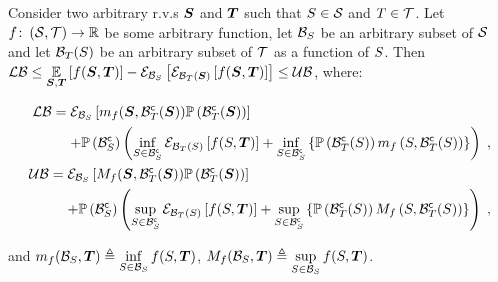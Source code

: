 \begin{propositionE}
	\label{thm:bound_multi_cond}
	Consider two arbitrary r.v.s $\RV$ and $\RVI$ such that $\variable\in\Space$ and $\variableI\in\SpaceI$. Let $f\colon\left(\Space,\SpaceI\right)\to\R$ be some arbitrary function, let $\subSpaceI{\variable}$ be an arbitrary subset of $\Space$ and let $\subSpaceI{\variableI}(\variable)$ be an arbitrary subset of $\SpaceI$ as a function of $\variable$. Then $\lowerbound\leq\expectation{f(\RV,\RVI)}{\RV,\RVI}-\partialexpectation{\partialexpectation{f(\RV,\RVI)}{\subSpaceI{\variableI}(\RV)}}{\subSpaceI{\variable}}\leq\upperbound$, where:
	\begin{small}
		\begin{subequations}
			\begin{align}
				\begin{split}
					\lowerbound & = \partialexpectation{m_f(\RV,\stcompI{\subSpace}{\variableI}(\RV))\measure{\stcompI{\subSpace}{\variableI}(\RV)}}{\subSpaceI{\variable}}
					\\
					& \phantomeq+\measure{\stcompI{\subSpace}{\variable}}\left(\inf_{\variable\in\stcompI{\subSpace}{\variable}}\partialexpectation{f(\variable,\RVI)}{\subSpaceI{\variableI}(\variable)}+\inf_{\variable\in\stcompI{\subSpace}{\variable}}\left\{\measure{\stcompI{\subSpace}{\variableI}(\variable)}m_f\left(\variable,\stcompI{\subSpace}{\variableI}(\variable)\right)\right\}\right)\;,
				\end{split}
				\\
				\begin{split}
					\upperbound & = \partialexpectation{M_f(\RV,\stcompI{\subSpace}{\variableI}(\RV))\measure{\stcompI{\subSpace}{\variableI}(\RV)}}{\subSpaceI{\variable}}
					\\
					& \phantomeq+\measure{\stcompI{\subSpace}{\variable}}\left(\sup_{\variable\in\stcompI{\subSpace}{\variable}}\partialexpectation{f(\variable,\RVI)}{\subSpaceI{\variableI}(\variable)}+\sup_{\variable\in\stcompI{\subSpace}{\variable}}\left\{\measure{\stcompI{\subSpace}{\variableI}(\variable)}M_f\left(\variable,\stcompI{\subSpace}{\variableI}(\variable)\right)\right\}\right)\;,
				\end{split}
			\end{align}
		\end{subequations}
	\end{small}
	and $m_f(\subSpaceI{\variable},\RVI)\triangleq\inf\limits_{\variable\in\subSpaceI{\variable}}f(\variable,\RVI)$, $M_f(\subSpaceI{\variable},\RVI)\triangleq\sup\limits_{\variable\in\subSpaceI{\variable}}f(\variable,\RVI)$.
\end{propositionE}

